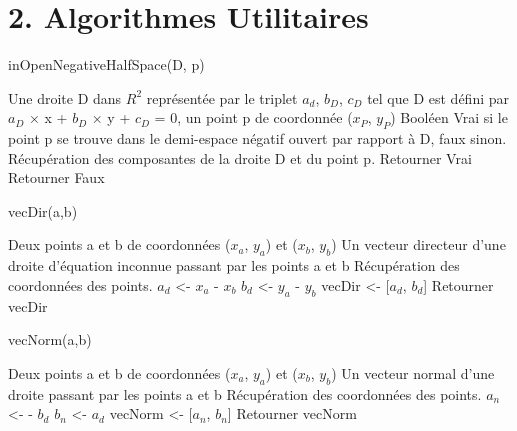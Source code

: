 \documentclass[a4paper,12pt]{report}	%
\begin{document}
	{\section*{2. Algorithmes Utilitaires}}
	
	\begin{algorithm}
	\caption{inOpenNegativeHalfSpace(D, p)}
	\label{Modele pour un algo}
	\begin{algorithmic} [2]
	\REQUIRE Une droite D dans $R^2$ représentée par le triplet $a_d$, $b_D$, $c_D$ tel que D est défini par $a_D$ $\times$ x + $b_D$ $\times$ y + $c_D$ = 0, un point p de coordonnée ($x_P$, $y_P$)
	\ENSURE Booléen Vrai si le point p se trouve dans le demi-espace négatif ouvert par rapport à D, faux sinon. 
	\STATE Récupération des composantes de la droite D et du point p.
	\STATE Retourner Vrai
	\ELSE
	\STATE Retourner Faux
	\ENDIF
	\end{algorithmic}
	\end{algorithm}
	
	
	\begin{algorithm}
	\caption{vecDir(a,b)}
	\label{Modele pour un algo}
	\begin{algorithmic} [3]
	\REQUIRE Deux points a et b de coordonnées ($x_{a}$, $y_{a}$) et ($x_{b}$, $y_{b}$) 
	\ENSURE Un vecteur directeur d’une droite d’équation inconnue passant par les points a et b
	\STATE Récupération des coordonnées des points.
	\STATE $a_{d}$ <- $x_{a}$ - $x_{b}$
	\STATE $b_{d}$ <- $y_{a}$ - $y_{b}$
	\STATE vecDir <- [$a_{d}$, $b_{d}$]
	\STATE Retourner vecDir
	\end{algorithmic}
	\end{algorithm}
	
	
	\begin{algorithm}
	\caption{vecNorm(a,b)}
	\label{Modele pour un algo}
	\begin{algorithmic} [4]
	\REQUIRE Deux points a et b de coordonnées ($x_{a}$, $y_{a}$) et ($x_{b}$, $y_{b}$) 
	\ENSURE Un vecteur normal d'une droite  passant par les points a et b
	\STATE Récupération des coordonnées des points.
	\STATE $a_{n}$ <- - $b_d$
	\STATE $b_{n}$ <- $a_d$
	\STATE vecNorm <- [$a_{n}$, $b_{n}$]
	\STATE Retourner vecNorm
	\end{algorithmic}
	\end{algorithm}
	
\end{document}
